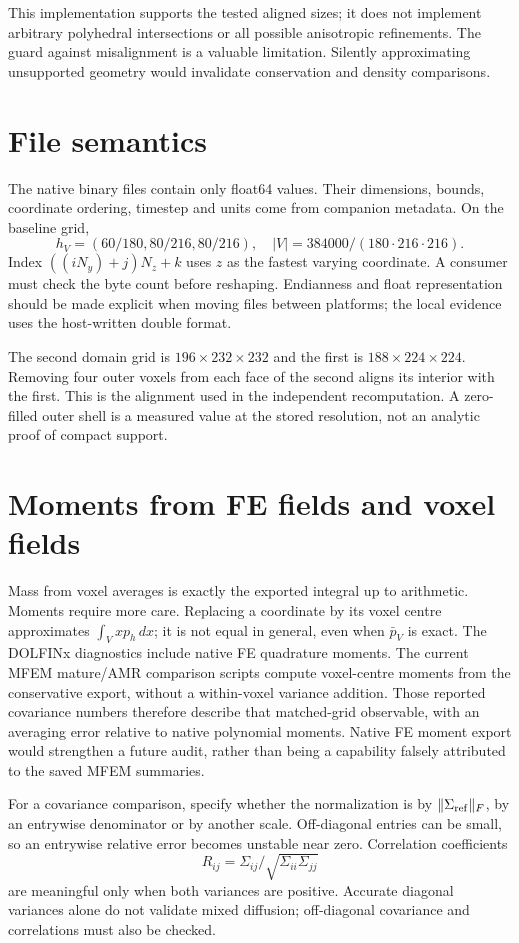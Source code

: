 This implementation supports the tested aligned sizes; it does not implement arbitrary polyhedral intersections or all possible anisotropic refinements. The guard against misalignment is a valuable limitation. Silently approximating unsupported geometry would invalidate conservation and density comparisons.

\section{File semantics}
The native binary files contain only float64 values. Their dimensions, bounds, coordinate ordering, timestep and units come from companion metadata. On the baseline grid,
\begin{equation}
 h_V=(60/180,80/216,80/216),\quad
 |V|=384000/(180\cdot216\cdot216).
\end{equation}
Index $((iN_y)+j)N_z+k$ uses $z$ as the fastest varying coordinate. A consumer must check the byte count before reshaping. Endianness and float representation should be made explicit when moving files between platforms; the local evidence uses the host-written double format.

The second domain grid is $196\times232\times232$ and the first is $188\times224\times224$. Removing four outer voxels from each face of the second aligns its interior with the first. This is the alignment used in the independent recomputation. A zero-filled outer shell is a measured value at the stored resolution, not an analytic proof of compact support.

\section{Moments from FE fields and voxel fields}
Mass from voxel averages is exactly the exported integral up to arithmetic. Moments require more care. Replacing a coordinate by its voxel centre approximates $\int_Vxp_h\,dx$; it is not equal in general, even when $\bar p_V$ is exact. The DOLFINx diagnostics include native FE quadrature moments. The current MFEM mature/AMR comparison scripts compute voxel-centre moments from the conservative export, without a within-voxel variance addition. Those reported covariance numbers therefore describe that matched-grid observable, with an averaging error relative to native polynomial moments. Native FE moment export would strengthen a future audit, rather than being a capability falsely attributed to the saved MFEM summaries.

For a covariance comparison, specify whether the normalization is by $\|\Sigma_{\rm ref}\|_F$, by an entrywise denominator or by another scale. Off-diagonal entries can be small, so an entrywise relative error becomes unstable near zero. Correlation coefficients
\begin{equation}
 R_{ij}=\Sigma_{ij}/\sqrt{\Sigma_{ii}\Sigma_{jj}}
\end{equation}
are meaningful only when both variances are positive. Accurate diagonal variances alone do not validate mixed diffusion; off-diagonal covariance and correlations must also be checked.

